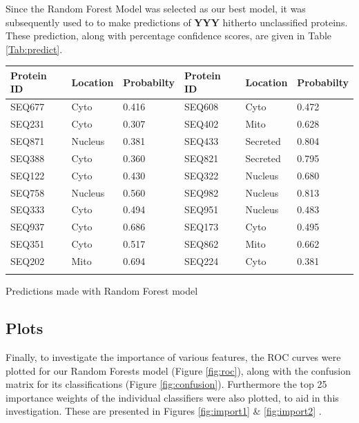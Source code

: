 \documentclass{bioinfo}
\begin{document}
Since the Random Forest Model was selected as our best model, it was subsequently used to to make predictions of \textbf{YYY} hitherto unclassified proteins. These prediction, along with percentage confidence scores, are given in Table \ref{Tab:predict}.

\begin{table}[!h]
 {\begin{tabular}{@{}lll|lll@{}}\toprule Protein ID  &  Location & Probabilty & Protein ID  &  Location & Probabilty\\\midrule
SEQ677 & Cyto & 0.416  & SEQ608 & Cyto & 0.472  \\
SEQ231 & Cyto & 0.307  & SEQ402 & Mito & 0.628  \\
SEQ871 & Nucleus & 0.381  & SEQ433 & Secreted & 0.804  \\
SEQ388 & Cyto & 0.360  & SEQ821 & Secreted & 0.795  \\
SEQ122 & Cyto & 0.430  & SEQ322 & Nucleus & 0.680  \\
SEQ758 & Nucleus & 0.560  & SEQ982 & Nucleus & 0.813  \\
SEQ333 & Cyto & 0.494  & SEQ951 & Nucleus & 0.483  \\
SEQ937 & Cyto & 0.686  & SEQ173 & Cyto & 0.495  \\
SEQ351 & Cyto & 0.517  & SEQ862 & Mito & 0.662  \\
SEQ202 & Mito & 0.694  & SEQ224 & Cyto & 0.381  \\\botrule
\end{tabular}}{Predictions made with Random Forest model}
\end{table}


\subsection{Plots}

Finally, to investigate the importance of various features, the ROC curves were plotted for our Random Forests model  (Figure \ref{fig:roc}), along with the confusion matrix for its classifications (Figure \ref{fig:confusion}). 
Furthermore the top 25 importance weights of the individual classifiers were also plotted, to aid in this investigation. 
These are presented in Figures \ref{fig:import1} \&  \ref{fig:import2} .

\end{document}
